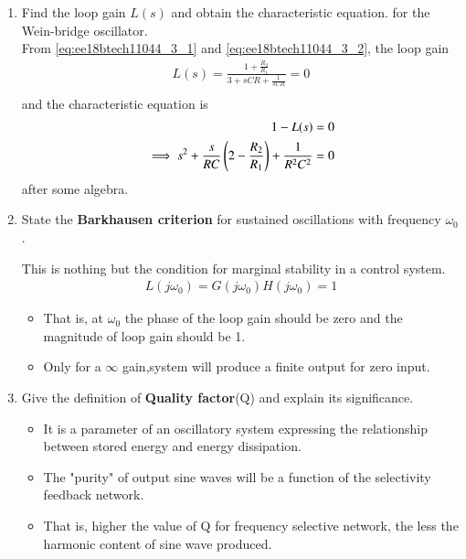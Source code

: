\begin{enumerate}[label=\arabic*.,ref=\theenumi]
\item Find the loop gain $L(s)$ and obtain the characteristic equation.
 for the Wein-bridge oscillator.
\\
\solution From \eqref{eq:ee18btech11044_3_1} and \eqref{eq:ee18btech11044_3_2},
the loop gain 
\begin{align}
    L(s) =  \frac{1 + \frac{R_2}{R_1}}{3 + sCR + \frac{1}{sCR}} = 0  \\
\end{align}
and the characteristic equation is 
\begin{align}
    1 - L(s) &= 0  \\
\implies     s^2 +  \frac{s}{RC}\brak{2-\frac{R_2}{R_1}} + \frac{1}{R^2C^2} &= 0 \label{eq:ee18btech11044_3_3}\end{align}
%
after some algebra.

\item State the \textbf{Barkhausen criterion} for sustained oscillations with frequency $\omega_0$.

\solution  This is nothing but the condition for marginal stability in a control system.
\begin{align}
    L(j\omega_0) = G(j\omega_0)  H(j\omega_0) = 1
\end{align}
\begin{itemize}
    \item That is, at $\omega_0$ the phase of the loop gain should be zero and the magnitude of loop gain should be 1.
    \item Only for a $\infty$ gain,system will produce a finite output for zero input. 
\end{itemize}

\item Give the definition of \textbf{Quality factor}(Q) and explain its significance.

\solution

\begin{itemize}
    \item It is a parameter of an oscillatory system expressing the relationship between stored energy and energy dissipation.
    \item The "purity" of output sine waves will be a function of the selectivity feedback network.
    \item That is, higher the value of Q for frequency selective network, the less the harmonic content of sine wave produced.
\end{itemize}
 



\end{enumerate}

